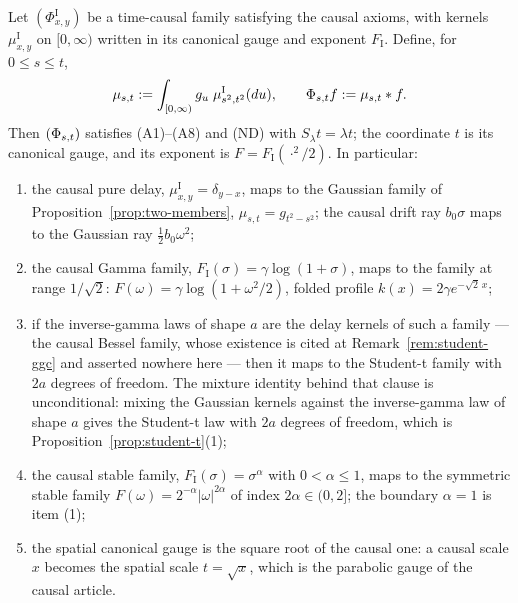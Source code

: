 \begin{proposition}\label{prop:bridge-families}
Let $(\Phi^{\mathrm I}_{x,y})$ be a time-causal family satisfying the causal axioms, with
kernels $\mu^{\mathrm I}_{x,y}$ on $[0,\infty)$ written in its canonical gauge and exponent
$F_{\mathrm I}$. Define, for $0 \le s \le t$,
\begin{equation}\label{eq:bridge-families}
  \mu_{s,t} := \int_{[0,\infty)} g_u\;\mu^{\mathrm I}_{s^2,t^2}(du),
  \qquad \Phi_{s,t}f := \mu_{s,t} * f .
\end{equation}
Then $(\Phi_{s,t})$ satisfies (A1)--(A8) and (ND) with $S_\lambda t = \lambda t$; the
coordinate $t$ is its canonical gauge, and its exponent is $F = F_{\mathrm I}(\cdot^2/2)$. In
particular:
\begin{enumerate}
\item the causal pure delay, $\mu^{\mathrm I}_{x,y} = \delta_{y-x}$, maps to the Gaussian family
of Proposition~\ref{prop:two-members}, $\mu_{s,t} = g_{t^2-s^2}$; the causal drift ray
$b_0\sigma$ maps to the Gaussian ray $\tfrac12 b_0\omega^2$;
\item the causal Gamma family, $F_{\mathrm I}(\sigma) = \gamma\log(1+\sigma)$, maps to the
\Matern{} family at range $1/\sqrt2$: $F(\omega) = \gamma\log(1 + \omega^2/2)$, folded profile
$k(x) = 2\gamma e^{-\sqrt2\,x}$;
\item if the inverse-gamma laws of shape $a$ are the delay kernels of such a family --- the causal
Bessel family, whose existence is cited at Remark~\ref{rem:student-ggc} and asserted nowhere here
--- then it maps to the Student-t family with $2a$ degrees of freedom. The mixture identity behind
that clause is unconditional: mixing the Gaussian kernels against the inverse-gamma law of shape
$a$ gives the Student-t law with $2a$ degrees of freedom, which is
Proposition~\ref{prop:student-t}(1);
\item the causal stable family, $F_{\mathrm I}(\sigma) = \sigma^\alpha$ with
$0 < \alpha \le 1$, maps to the symmetric stable family
$F(\omega) = 2^{-\alpha}|\omega|^{2\alpha}$ of index $2\alpha \in (0,2]$; the boundary
$\alpha = 1$ is item (1);
\item the spatial canonical gauge is the square root of the causal one: a causal scale $x$
becomes the spatial scale $t = \sqrt x$, which is the parabolic gauge of the causal article.
\end{enumerate}
\end{proposition}

